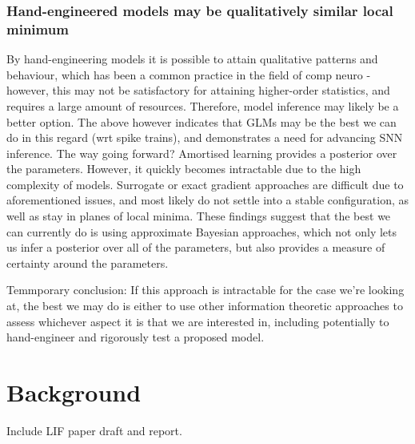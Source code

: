 \documentclass[mphil,deptreport,ai]{infthesis} %
\begin{document}
\subsection{Hand-engineered models may be qualitatively similar local minimum}
By hand-engineering models it is possible to attain qualitative patterns and behaviour, which has been a common practice in the field of comp neuro - however, this may not be satisfactory for attaining higher-order statistics, and requires a large amount of resources. Therefore, model inference may likely be a better option. 
The above however indicates that GLMs may be the best we can do in this regard (wrt spike trains), and demonstrates a need for advancing SNN inference.
The way going forward?
Amortised learning provides a posterior over the parameters.
However, it quickly becomes intractable due to the high complexity of models.
Surrogate or exact gradient approaches are difficult due to aforementioned issues, and most likely do not settle into a stable configuration, as well as stay in planes of local minima.
These findings suggest that the best we can currently do is using approximate Bayesian approaches, which not only lets us infer a posterior over all of the parameters, but also provides a measure of certainty around the parameters.

Temmporary conclusion:
If this approach is intractable for the case we’re looking at, the best we may do is either to use other information theoretic approaches to assess whichever aspect it is that we are interested in, including potentially to hand-engineer and rigorously test a proposed model.



\chapter{Background}



Include LIF paper draft and report.
\end{document}
